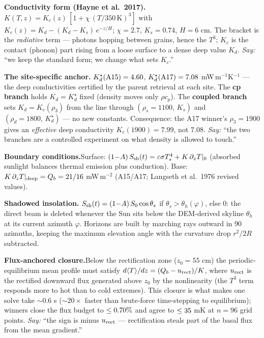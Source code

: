 \documentclass[11pt]{article}
\begin{document}
\textbf{Conductivity form (Hayne et al.\ 2017).}\quad
$K(T,z)=K_c(z)\,[1+\chi\,(T/350\,\mathrm{K})^3]$ with
$K_c(z)=K_d-(K_d-K_s)\,e^{-z/H}$; $\chi=2.7$, $K_s=0.74$, $H=6$ cm.
The bracket is the \emph{radiative} term --- photons hopping between grains,
hence the $T^3$; $K_c$ is the contact (phonon) part rising from a loose
surface to a dense deep value $K_d$.
\emph{Say:} ``we keep the standard form; we change what sets $K_c$.''

\textbf{The site-specific anchor.}\quad
$K_d^{\star}(\mathrm{A15})=4.60$, $K_d^{\star}(\mathrm{A17})=7.08$
mW\,m$^{-1}$K$^{-1}$ --- the deep conductivities certified by the parent
retrieval at each site. The \textbf{cp branch} holds $K_d=K_d^{\star}$ fixed
(density moves only $\rho c_p$). The \textbf{coupled branch} sets
$K_d=K_c(\rho_3)$ from the line through $(\rho_s{=}1100,\,K_s)$ and
$(\rho_d{=}1800,\,K_d^{\star})$ --- no new constants. Consequence: the A17
winner's $\rho_3=1900$ gives an \emph{effective} deep conductivity
$K_c(1900)=7.99$, not $7.08$.
\emph{Say:} ``the two branches are a controlled experiment on what density is
allowed to touch.''

\textbf{Boundary conditions.}\quad Surface:
$(1{-}A)\,S_{\rm sh}(t)=\varepsilon\sigma T_s^4+K\,\partial_z T|_0$
(absorbed sunlight balances thermal emission plus conduction). Base:
$K\,\partial_z T|_{\rm deep}=Q_b=21/16$ mW\,m$^{-2}$ (A15/A17; Langseth
et al.\ 1976 revised values).

\textbf{Shadowed insolation.}\quad
$S_{\rm sh}(t)=(1{-}A)\,S_0\cos\theta_s$ if $\theta_s>\theta_h(\varphi)$,
else $0$: the direct beam is deleted whenever the Sun sits below the
DEM-derived skyline $\theta_h$ at its current azimuth $\varphi$. Horizons are
built by marching rays outward in 90 azimuths, keeping the maximum elevation
angle with the curvature drop $r^2/2R$ subtracted.

\textbf{Flux-anchored closure.}\quad Below the rectification zone
($z_0=55$ cm) the periodic-equilibrium mean profile must satisfy
$d\langle T\rangle/dz=(Q_b-u_{\rm rect})/K$, where $u_{\rm rect}$ is the
rectified downward flux generated above $z_0$ by the nonlinearity (the
$T^3$ term responds more to hot than to cold extremes). This closure is what
makes one solve take ${\sim}0.6$ s (${\sim}20\times$ faster than brute-force
time-stepping to equilibrium); winners close the flux budget to
$\le0.70\%$ and agree to $\le35$ mK at $n{=}96$ grid points.
\emph{Say:} ``the sign is minus $u_{\rm rect}$ --- rectification steals part
of the basal flux from the mean gradient.''
\end{document}
